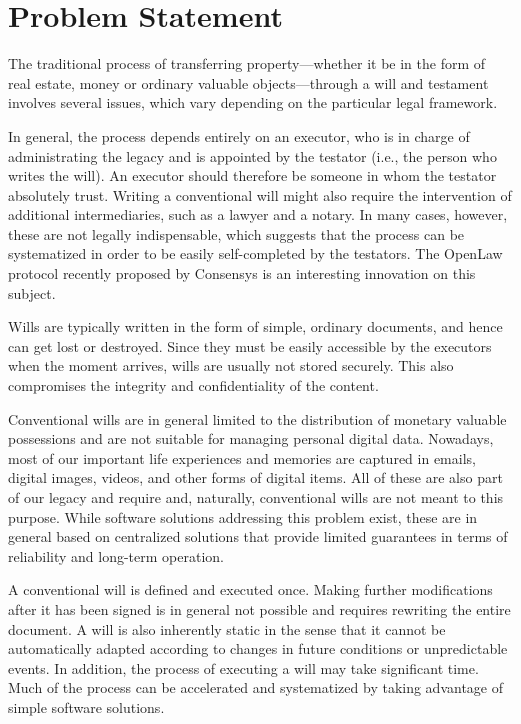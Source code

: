 \section{Problem Statement} %
\label{sec:problem_statement}
The traditional process of transferring property---whether it be in the form of real estate, money or ordinary valuable objects---through a will and testament involves several issues, which vary depending on the particular legal framework. 

In general, the process depends entirely on an executor, who is in charge of administrating the legacy and is appointed by the testator (i.e., the person who writes the will). An executor should therefore be someone in whom the testator absolutely trust.  Writing a conventional will might also require the intervention of additional  intermediaries, such as a lawyer and a notary. In many cases, however, these are not legally indispensable, which suggests that the process can be systematized in order to be easily self-completed by the testators. The OpenLaw protocol recently proposed by Consensys \cite{cite_required} is an interesting innovation on this subject. 

Wills are typically written in the form of simple, ordinary documents, and hence can get lost or destroyed. Since they must be easily accessible by the executors when the moment arrives, wills are usually not stored securely. This also compromises the integrity and confidentiality of the content.
  
Conventional wills are in general limited to the distribution of monetary valuable possessions and are not suitable for managing personal digital data. Nowadays, most of our important life experiences and memories are captured in emails, digital images, videos,  and other forms of digital items. All of these are also part of our legacy and require  and, naturally, conventional wills are not meant to this purpose. While software solutions addressing this problem exist, these are in general based on centralized solutions that provide limited guarantees in terms of reliability and long-term operation.

A conventional will is defined and executed once. Making further modifications after it has been signed is in general not possible and requires rewriting the entire document. A will is also inherently static in the sense that it cannot be automatically adapted according to changes in future conditions or unpredictable events. In addition, the process of executing a will may take significant time. Much of the process can be accelerated and systematized by taking advantage of simple software solutions. 

